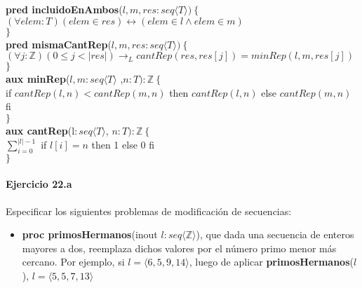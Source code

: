 \documentclass[a4paper]{article}
\begin{document}
			\textbf{pred incluidoEnAmbos}($l,m,res:seq\langle T\rangle)
			\ \{$\smallskip \\
			\hspace*{6mm}$ (\forall elem:T)(elem\in res) \leftrightarrow (elem\in l \wedge 
			elem\in m)$\\
			\hspace*{5mm}$\}$\smallskip \\	
			
			\textbf{pred mismaCantRep}($l,m,res:seq\langle T\rangle)
			\ \{$\smallskip \\
			\hspace*{6mm}$(\forall j:\mathbb{Z})(0\leq j<|res|)\rightarrow_L
			cantRep(res,res[j])=minRep(l,m,res[j])$\\
			\hspace*{5mm}$\}$\smallskip \\	
			
			\textbf{aux minRep}($l,m:seq\langle T\rangle$
				,$n:T ):\mathbb{Z}\ \{$\smallskip \\
			\hspace*{6mm}if $cantRep(l,n)<cantRep(m,n)$
				 then $cantRep(l,n)$ else $cantRep(m,n)$ fi\\
			\hspace*{5mm}$\}$\smallskip \\			
			
			\textbf{aux cantRep}(l$: seq\langle T\rangle$, $n:T):\mathbb{Z}
			\ \{$\smallskip \\
			\hspace*{6mm}$\sum_{i=0}^{|l|-1}$ if $l[i]=n$ then 1 else 0 fi\\
			\hspace*{5mm}$\}$\smallskip \\	

\paragraph*{Ejercicio 22.a} Especificar los siguientes problemas de modificación de secuencias:
	\begin{itemize}
		\item \textbf{proc primosHermanos}(inout $l:seq\langle \mathbb{Z}\rangle$), que dada una secuencia de enteros mayores a dos, reemplaza dichos valores por el número primo menor más cercano. Por ejemplo, si $l=\langle 6,5,9,14 \rangle$, luego de aplicar \textbf{primosHermanos}($l$), $l=\langle 5,5,7,13 \rangle$
	\end{itemize}
	
\end{document}
